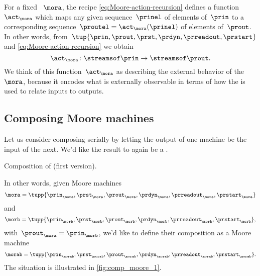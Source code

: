 For a fixed ~$\mora$, the recipe \cref{eq:Moore-action-recursion} defines a function~$\act_\mora$ which maps any given sequence~$\prinel$ of elements of~$\prin$ to a corresponding sequence~$\proutel = \act_\mora(\prinel)$ of elements of~$\prout$.
In other words, from~$\tup{\prin, \prout, \prst, \prdyn, \prreadout, \prstart}$ and \cref{eq:Moore-action-recursion} we obtain
\begin{equation}
    \act_\mora \colon \streamsof\prin  \to \streamsof\prout.
\end{equation}
We think of this function~$\act_\mora$ as describing the external behavior of the ~$\mora$, because it encodes what is externally observable in terms of how the  is used to relate inputs to outputs.


\subsection{Composing Moore machines}

Let us consider composing  serially by letting the output of one machine be the input of the next.
We'd like the result to again be a .

\begin{marginfigure}
    \centering
    \caption{Composition of  (first version).}
    \label{fig:comp_moore_1}
\end{marginfigure}

In other words, given Moore machines
%
\begin{equation}
    \label{eq:moore-mora}
    \mora = \tupp{\prin_{\mora},\prst_{\mora},\prout_{\mora},\prdyn_{\mora},\prreadout_{\mora},\prstart_{\mora}}
\end{equation}
%
and
%
\begin{equation}
    \label{eq:moore-morb}
    \morb = \tupp{\prin_{\morb},\prst_{\morb},\prout_{\morb},\prdyn_{\morb},\prreadout_{\morb},\prstart_{\morb}},
\end{equation}
with~$\prout_{\mora} = \prin_{\morb}$, we'd like to define their composition as a Moore machine
\begin{equation}
    \label{eq:moore-morab-comp}
    \morab = \tupp{\prin_{\morab},\prst_{\morab},\prout_{\morab},\prdyn_{\morab},\prreadout_{\morab},\prstart_{\morab}}.
\end{equation}
The situation is illustrated in \cref{fig:comp_moore_1}.

